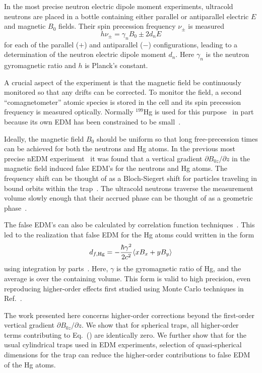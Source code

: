 \documentclass[preprint,12pt]{elsarticle}
\begin{document}
In the most precise neutron electric dipole moment experiments,
ultracold neutrons are placed in a bottle containing either parallel
or antiparallel electric $E$ and magnetic $B_0$ fields.  Their spin
precession frequency $\nu_\pm$ is measured
\begin{equation}
h\nu_\pm=\gamma_nB_0\pm 2d_nE
\end{equation}
for each of the parallel ($+$) and antiparallel ($-$) configurations,
leading to a determination of the neutron electric dipole moment
$d_n$.  Here $\gamma_n$ is the neutron gyromagnetic ratio and $h$ is
Planck's constant.

A crucial aspect of the experiment is that the magnetic field be
continuously monitored so that any drifts can be corrected.  To
monitor the field, a second ``comagnetometer'' atomic species is
stored in the cell and its spin precession frequency is measured
optically.  Normally $^{199}$Hg is used for this
purpose~\cite{bib:green,bib:hg-better} in part because its own EDM has
been constrained to be small~\cite{bib:hgupdate}.

Ideally, the magnetic field $B_0$ should be uniform so that long
free-precession times can be achieved for both the neutrons and Hg
atoms.  In the previous most precise nEDM
experiment~\cite{bib:baker,bib:pendlebury} it was found that a
vertical gradient $\partial B_{0z}/\partial z$ in the magnetic field
induced false EDM's for the neutrons and Hg atoms.  The frequency
shift can be thought of as a Bloch-Siegert shift for particles
traveling in bound orbits within the trap~\cite{bib:gpe1,bib:gpe2}.
The ultracold neutrons traverse the measurement volume slowly enough
that their accrued phase can be thought of as a geometric
phase~\cite{bib:gpe1}.

The false EDM's can also be calculated by correlation function
techniques~\cite{bib:gpe3,bib:gpe4}.  This led to the realization that
false EDM for the Hg atoms could written in the form
\begin{equation}
\label{eq:pignol}
  d_{f,\rm Hg}=-\frac{\hbar\gamma^{2}}{2c^{2}}\langle xB_x+yB_y\rangle
\end{equation}
using integration by parts~\cite{bib:pignol-roccia}.  Here, $\gamma$ is the gyromagnetic ratio of Hg, and the average is over the containing volume. This
form is valid to high precision, even reproducing higher-order effects
first studied using Monte Carlo techniques in Ref.~\cite{bib:gpe2}.

The work presented here concerns higher-order corrections beyond the
first-order vertical gradient $\partial B_{0z}/\partial z$.  We show
that for spherical traps, all higher-order terms contributing to
Eq.~(\cite{eq:pignol}) are identically zero.  We further show that for
the usual cylindrical traps used in EDM experiments, selection of
quasi-spherical dimensions for the trap can reduce the higher-order
contributions to false EDM of the Hg atoms.
\end{document}
